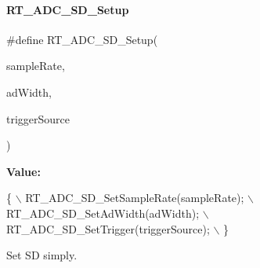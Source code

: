 \paragraph{\texorpdfstring{R\+T\+\_\+\+A\+D\+C\+\_\+\+S\+D\+\_\+\+Setup}{RT\_ADC\_SD\_Setup}}
{\footnotesize\ttfamily \#define R\+T\+\_\+\+A\+D\+C\+\_\+\+S\+D\+\_\+\+Setup(\begin{DoxyParamCaption}\item[{}]{sample\+Rate,  }\item[{}]{ad\+Width,  }\item[{}]{trigger\+Source }\end{DoxyParamCaption})}

{\bfseries Value\+:}
\begin{DoxyCode}
\{                                        \(\backslash\)
        RT\_ADC\_SD\_SetSampleRate(sampleRate); \(\backslash\)
        RT\_ADC\_SD\_SetAdWidth(adWidth);      \(\backslash\)
        RT\_ADC\_SD\_SetTrigger(triggerSource); \(\backslash\)
    \}
\end{DoxyCode}


Set SD simply. 


